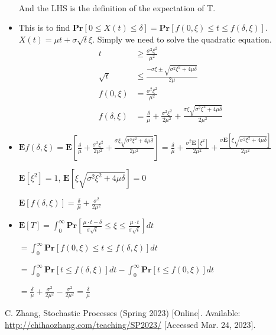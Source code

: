 \documentclass{article}
\theoremstyle{definition}
\begin{document}
\begin{itemize}
\begin{equation}
\begin{aligned}
			\end{aligned}
		\end{equation}
		And the LHS is the definition of the expectation of T.
		\item This is to find $\mathbf{Pr}[0\leq X(t)\leq\delta] = \mathbf{Pr}[f(0,\xi)\leq t \leq f(\delta, \xi)]$. $X(t) = \mu t+\sigma\sqrt{t} \xi$. Simply we need to solve the quadratic equation.
		\begin{equation}
			\begin{aligned}
				t&\geq \frac{\sigma^2\xi^2}{\mu^2} \\
				\sqrt{t} &\leq \frac{-\sigma\xi\pm\sqrt{\sigma^2\xi^2+4\mu\delta}}{2\mu}\\
				f(0, \xi) &= \frac{\sigma^2\xi^2}{\mu^2}\\
				f(\delta, \xi) &= \frac{\delta}{\mu} + \frac{\sigma^2\xi^2}{2\mu^2} + \frac{\sigma\xi\sqrt{\sigma^2\xi^2+4\mu\delta}}{2\mu^2}
			\end{aligned}
		\end{equation}
		\item $\mathbf E{f(\delta,\xi)} = \mathbf E[\frac{\delta}{\mu} + \frac{\sigma^2\xi^2}{2\mu^2} + \frac{\sigma\xi\sqrt{\sigma^2\xi^2+4\mu\delta}}{2\mu^2}]=\frac{\delta}{\mu} + \frac{\sigma^2\mathbf E[\xi^2]}{2\mu^2} + \frac{\sigma\mathbf E[\xi\sqrt{\sigma^2\xi^2+4\mu\delta}]}{2\mu^2}$
		
		$\mathbf E[\xi^2] = 1$, $\mathbf E[\xi\sqrt{\sigma^2\xi^2+4\mu\delta}] = 0$
		
		$\mathbf E[f(\delta,\xi)] = \frac{\delta}{\mu}+\frac{\sigma^2}{2\mu^2}$ 
		\item $\mathbf E [T] = \int_0^\infty\mathbf{Pr}\left[\frac{\mu\cdot t-\delta}{\sigma \sqrt{t}}\leq\xi\leq\frac{\mu\cdot t}{\sigma \sqrt{t}} \right]dt$
		
		$=\int_0^\infty\mathbf{Pr}[f(0,\xi)\leq t \leq f(\delta, \xi)]dt$
		
		$=\int_0^\infty\mathbf{Pr}[t \leq f(\delta, \xi)]dt-\int_0^\infty\mathbf{Pr}[t \leq f(0, \xi)]dt$
		
		$=\frac{\delta}{\mu}+\frac{\sigma^2}{2\mu^2}-\frac{\sigma^2}{2\mu^2} = \frac{\delta}{\mu}$
	\end{itemize}
	\begin{thebibliography}{99}
		 C. Zhang, Stochastic Processes (Spring 2023) [Online]. Available: \url{http://chihaozhang.com/teaching/SP2023/} [Accessed Mar. 24, 2023].
	\end{thebibliography}
\end{document}

